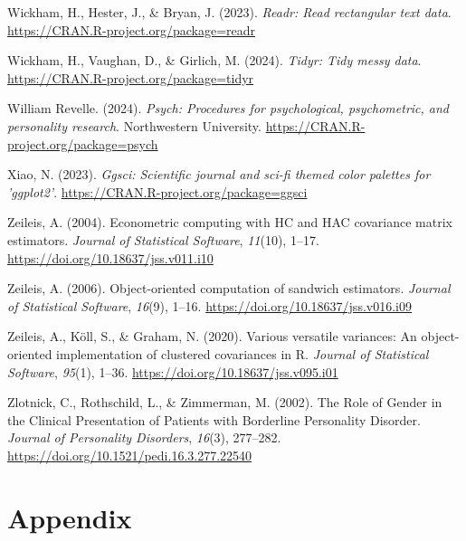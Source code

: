 \documentclass[
  man,floatsintext]{apa7}
\newlength{\cslhangindent}
\newlength{\cslentryspacingunit} %
\newenvironment{CSLReferences}[2] %
 {%
  \setlength{\parindent}{0pt}
  \ifodd #1
  \let\oldpar\par
  \def\par{\hangindent=\cslhangindent\oldpar}
  \fi
  \setlength{\parskip}{#2\cslentryspacingunit}
 }%
 {}
\begin{document}
\begin{CSLReferences}{1}{0}
\leavevmode{}%
Wickham, H., Hester, J., \& Bryan, J. (2023). \emph{Readr: Read rectangular text data}. \url{https://CRAN.R-project.org/package=readr}

\leavevmode{}%
Wickham, H., Vaughan, D., \& Girlich, M. (2024). \emph{Tidyr: Tidy messy data}. \url{https://CRAN.R-project.org/package=tidyr}

\leavevmode{}%
William Revelle. (2024). \emph{Psych: Procedures for psychological, psychometric, and personality research}. Northwestern University. \url{https://CRAN.R-project.org/package=psych}

\leavevmode{}%
Xiao, N. (2023). \emph{Ggsci: Scientific journal and sci-fi themed color palettes for 'ggplot2'}. \url{https://CRAN.R-project.org/package=ggsci}

\leavevmode{}%
Zeileis, A. (2004). Econometric computing with {HC} and {HAC} covariance matrix estimators. \emph{Journal of Statistical Software}, \emph{11}(10), 1--17. \url{https://doi.org/10.18637/jss.v011.i10}

\leavevmode{}%
Zeileis, A. (2006). Object-oriented computation of sandwich estimators. \emph{Journal of Statistical Software}, \emph{16}(9), 1--16. \url{https://doi.org/10.18637/jss.v016.i09}

\leavevmode{}%
Zeileis, A., Köll, S., \& Graham, N. (2020). Various versatile variances: An object-oriented implementation of clustered covariances in {R}. \emph{Journal of Statistical Software}, \emph{95}(1), 1--36. \url{https://doi.org/10.18637/jss.v095.i01}

\leavevmode{}%
Zlotnick, C., Rothschild, L., \& Zimmerman, M. (2002). The {Role} of {Gender} in the {Clinical Presentation} of {Patients} with {Borderline Personality Disorder}. \emph{Journal of Personality Disorders}, \emph{16}(3), 277--282. \url{https://doi.org/10.1521/pedi.16.3.277.22540}

\end{CSLReferences}

\newpage

\hypertarget{appendix}{%
\section{Appendix}\label{appendix}}
\end{document}
